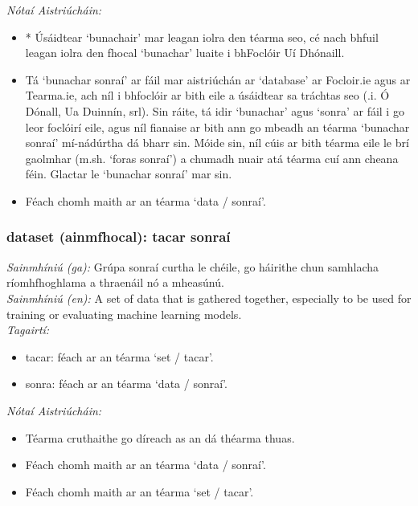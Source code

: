  \noindent \textit{Nótaí Aistriúcháin:}
\begin{itemize}
	\item * Úsáidtear `bunachair' mar leagan iolra den téarma seo, cé nach bhfuil leagan iolra den fhocal `bunachar' luaite i bhFoclóir Uí Dhónaill.
	\item Tá `bunachar sonraí' ar fáil mar aistriúchán ar `database' ar Focloir.ie agus ar Tearma.ie, ach níl i bhfoclóir ar bith eile a úsáidtear sa tráchtas seo (.i. Ó Dónall, Ua Duinnín, srl). Sin ráite, tá idir `bunachar' agus `sonra' ar fáil i go leor foclóirí eile, agus níl fianaise ar bith ann go mbeadh an téarma `bunachar sonraí' mí-nádúrtha dá bharr sin. Móide sin, níl cúis ar bith téarma eile le brí gaolmhar (m.sh. `foras sonraí') a chumadh nuair atá téarma cuí ann cheana féin. Glactar le `bunachar sonraí' mar sin.
	\item Féach chomh maith ar an téarma `data / sonraí'.
\end{itemize}


\subsubsection*{dataset (ainmfhocal): tacar sonraí}
 \noindent \textit{Sainmhíniú (ga):} Grúpa sonraí curtha le chéile, go háirithe chun samhlacha ríomhfhoghlama a thraenáil nó a mheasúnú.
\\
 \noindent \textit{Sainmhíniú (en):} A set of data that is gathered together, especially to be used for training or evaluating machine learning models.
\\
 \noindent \textit{Tagairtí:}
\begin{itemize}
	\item tacar: féach ar an téarma `set / tacar'.
	\item sonra: féach ar an téarma `data / sonraí'.
\end{itemize}

 \noindent \textit{Nótaí Aistriúcháin:}
\begin{itemize}
	\item Téarma cruthaithe go díreach as an dá théarma thuas.
	\item Féach chomh maith ar an téarma `data / sonraí'.
	\item Féach chomh maith ar an téarma `set / tacar'.
\end{itemize}


